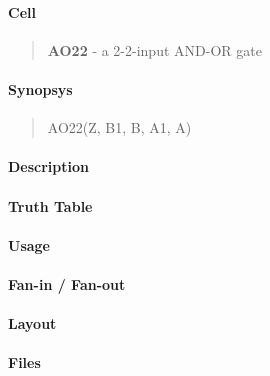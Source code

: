 \label{AO22}
\paragraph{Cell}
\begin{quote}
    \textbf{AO22} - a 2-2-input AND-OR gate
\end{quote}

\paragraph{Synopsys}
\begin{quote}
    AO22(Z, B1, B, A1, A)
\end{quote}

\paragraph{Description}

%

\paragraph{Truth Table}
%

\paragraph{Usage}

\paragraph{Fan-in / Fan-out}

\paragraph{Layout}

\paragraph{Files}
